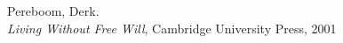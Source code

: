 \documentclass{article}
\begin{document}
\begin{thebibliography}{999}
  Pereboom, Derk.\\
  \emph{Living Without Free Will}, Cambridge University Press, 2001
%
%
%
%
\end{thebibliography}
\end{document}
